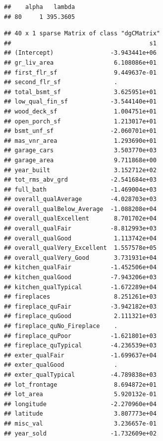 \documentclass[
]{article}
\newenvironment{Shaded}{\begin{snugshade}}{\end{snugshade}}
\newcommand{\CommentTok}[1]{\textcolor[rgb]{0.56,0.35,0.01}{\textit{#1}}}
\newcommand{\FunctionTok}[1]{\textcolor[rgb]{0.00,0.00,0.00}{#1}}
\newcommand{\NormalTok}[1]{#1}
\newcommand{\SpecialCharTok}[1]{\textcolor[rgb]{0.00,0.00,0.00}{#1}}
\begin{document}
\begin{verbatim}
##    alpha   lambda
## 80     1 395.3605
\end{verbatim}

\begin{Shaded}
\end{Shaded}

\begin{verbatim}
## 40 x 1 sparse Matrix of class "dgCMatrix"
##                                       s1
## (Intercept)                -3.943441e+06
## gr_liv_area                 6.108086e+01
## first_flr_sf                9.449637e-01
## second_flr_sf               .           
## total_bsmt_sf               3.625951e+01
## low_qual_fin_sf            -3.544140e+01
## wood_deck_sf                1.004751e+01
## open_porch_sf               1.213017e+01
## bsmt_unf_sf                -2.060701e+01
## mas_vnr_area                1.293690e+01
## garage_cars                 3.503770e+03
## garage_area                 9.711868e+00
## year_built                  3.152712e+02
## tot_rms_abv_grd            -2.541684e+03
## full_bath                  -1.469004e+03
## overall_qualAverage        -4.028703e+03
## overall_qualBelow_Average  -1.088208e+04
## overall_qualExcellent       8.701702e+04
## overall_qualFair           -8.812993e+03
## overall_qualGood            1.113742e+04
## overall_qualVery_Excellent  1.557578e+05
## overall_qualVery_Good       3.731931e+04
## kitchen_qualFair           -1.452506e+04
## kitchen_qualGood           -7.943206e+03
## kitchen_qualTypical        -1.672289e+04
## fireplaces                  8.251261e+03
## fireplace_quFair           -3.942182e+03
## fireplace_quGood            2.111321e+03
## fireplace_quNo_Fireplace    .           
## fireplace_quPoor           -1.621801e+03
## fireplace_quTypical        -4.236539e+03
## exter_qualFair             -1.699637e+04
## exter_qualGood              .           
## exter_qualTypical          -4.789838e+03
## lot_frontage                8.694872e+01
## lot_area                    5.920132e-01
## longitude                  -2.270960e+04
## latitude                    3.807773e+04
## misc_val                    3.236657e-01
## year_sold                  -1.732609e+02
\end{verbatim}
\end{document}
